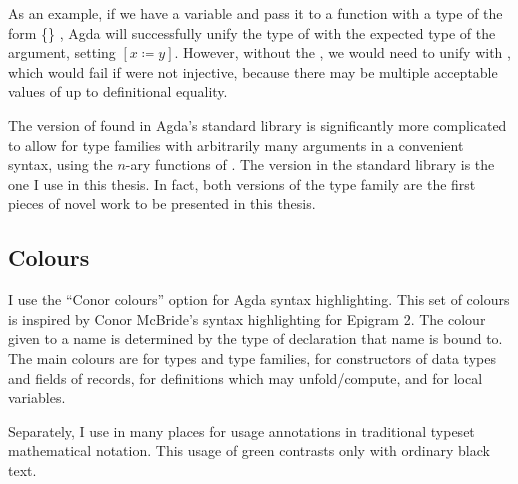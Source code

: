 
As an example, if we have a variable
\AgdaSpace{}\AgdaSymbol{:}\AgdaSpace{}%
\AgdaSpace{}\AgdaSpace{}
and pass it to a function with a type of the form
\AgdaSymbol{$\forall$}\AgdaSpace{}\AgdaSymbol\{\AgdaSymbol\}%
\AgdaSpace{}\AgdaSymbol{$\to$}\AgdaSpace{}\AgdaSpace{}%
\AgdaSpace{}\AgdaSpace{}\AgdaSymbol{$\to$}%
\AgdaSpace{}\AgdaSymbol{\_},
Agda will successfully unify the type of  with the expected type of
the argument, setting $[x \coloneqq y]$.
However, without the , we would need to unify
\AgdaSpace{} with
\AgdaSpace{}, which would fail if 
were not injective, because there may be multiple acceptable values of
 up to definitional equality.

The version of  found in Agda's standard library is
significantly more complicated to allow for type families with arbitrarily many
arguments in a convenient syntax, using the $n$-ary functions of
\citet{Allais19}.
The version in the standard library is the one I use in this thesis.
In fact, both versions of the  type family are the first pieces
of novel work to be presented in this thesis.

\subsection{Colours}

I use the ``Conor colours'' option for Agda syntax highlighting.
This set of colours is inspired by Conor McBride's syntax highlighting for
Epigram 2.
The colour given to a name is determined by the type of declaration that name
is bound to.
The main colours are  for types and type families,
 for constructors of data types and fields of records,
 for definitions which may unfold/compute, and
 for local variables.

Separately, I use  in many places for usage annotations in traditional
typeset mathematical notation.
This usage of green contrasts only with ordinary black text.
